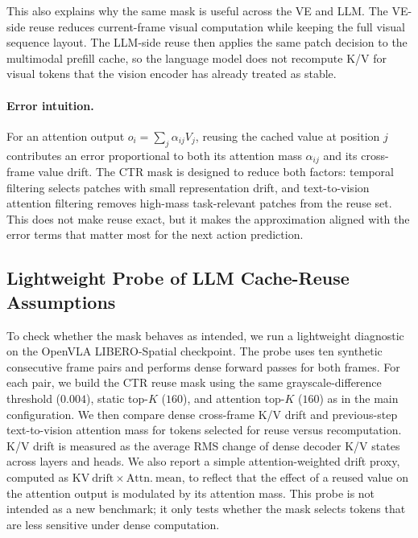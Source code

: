 This also explains why the same mask is useful across the VE and LLM.
The VE-side reuse reduces current-frame visual computation while keeping the full visual sequence layout.
The LLM-side reuse then applies the same patch decision to the multimodal prefill cache, so the language model does not recompute K/V for visual tokens that the vision encoder has already treated as stable.

\paragraph{Error intuition.}
For an attention output $o_i=\sum_j \alpha_{ij} V_j$, reusing the cached value at position $j$ contributes an error proportional to both its attention mass $\alpha_{ij}$ and its cross-frame value drift.
The CTR mask is designed to reduce both factors: temporal filtering selects patches with small representation drift, and text-to-vision attention filtering removes high-mass task-relevant patches from the reuse set.
This does not make reuse exact, but it makes the approximation aligned with the error terms that matter most for the next action prediction.

\subsection{Lightweight Probe of LLM Cache-Reuse Assumptions}
To check whether the mask behaves as intended, we run a lightweight diagnostic on the OpenVLA LIBERO-Spatial checkpoint.
The probe uses ten synthetic consecutive frame pairs and performs dense forward passes for both frames.
For each pair, we build the CTR reuse mask using the same grayscale-difference threshold ($0.004$), static top-$K$ ($160$), and attention top-$K$ ($160$) as in the main configuration.
We then compare dense cross-frame K/V drift and previous-step text-to-vision attention mass for tokens selected for reuse versus recomputation.
K/V drift is measured as the average RMS change of dense decoder K/V states across layers and heads.
We also report a simple attention-weighted drift proxy, computed as $\mathrm{KV\ drift}\times\mathrm{Attn.\ mean}$, to reflect that the effect of a reused value on the attention output is modulated by its attention mass.
This probe is not intended as a new benchmark; it only tests whether the mask selects tokens that are less sensitive under dense computation.

